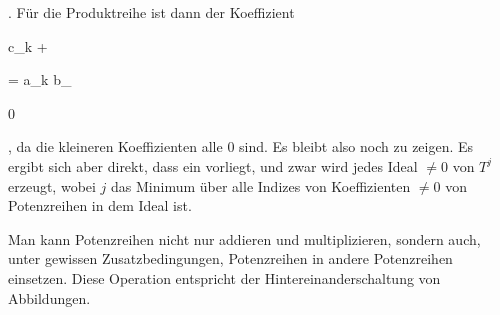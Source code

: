 {{{    }{
}

{   }{
}

}
{}{}{.}
Für die Produktreihe ist dann der Koeffizient


\mavergleichskettedisp

{\vergleichskette

{ c_{k + \ell}
}

{ =} { a_k b_\ell
}

{ \neq} { 0
}

{ } {
}

{ } {
}

}
{}{}{,}
da die kleineren Koeffizienten alle $0$ sind. Es bleibt also noch
zu zeigen. Es ergibt sich aber direkt, dass ein
vorliegt, und zwar wird jedes Ideal $\neq 0$ von $T^{j}$ erzeugt, wobei $j$ das Minimum über alle Indizes von Koeffizienten $\neq 0$ von Potenzreihen in dem Ideal ist.


}


Man kann Potenzreihen nicht nur addieren und multiplizieren, sondern auch, unter gewissen Zusatzbedingungen, Potenzreihen in andere Potenzreihen einsetzen. Diese Operation entspricht der Hintereinanderschaltung von Abbildungen.



{}


